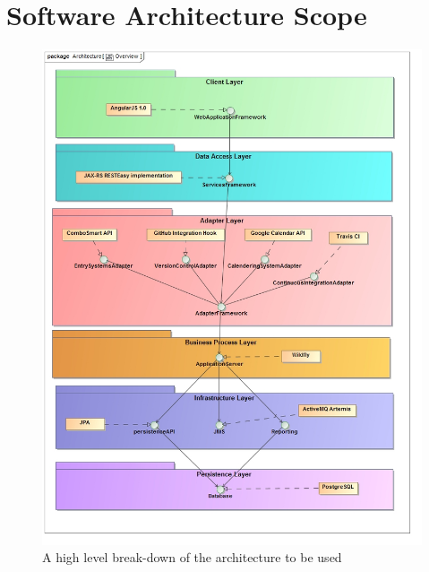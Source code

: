 \documentclass[11pt,a4paper]{article}
\begin{document}
	\thispagestyle{empty}
	\pagebreak
	
	\tableofcontents
	\pagebreak


\section{Software Architecture Scope}
\begin{figure}[H]
	\begin{center}
		\includegraphics[scale=0.4]{../Images/Architecture_Overview.jpg}
		\caption{A high level break-down of the architecture to be used}
	\end{center}
\end{figure}

\pagebreak
\end{document}
